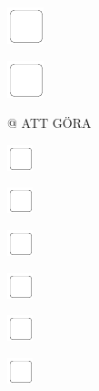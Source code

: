 \documentclass[11pt,titlepage]{article}
\begin{document}
\noindent
\includegraphics[]{checkbox-6mm.pdf}

\vspace{12mm}

\noindent
\includegraphics[]{checkbox-6mm.pdf}

\pagebreak

\small %

\noindent \hspace{-4mm} @ \hfill ATT GÖRA

\vspace{6mm}

\noindent
\includegraphics[]{checkbox-4mm.pdf}

\vspace{10mm}

\noindent
\includegraphics[]{checkbox-4mm.pdf}

\vspace{10mm}

\noindent
\includegraphics[]{checkbox-4mm.pdf}

\vspace{10mm}

\noindent
\includegraphics[]{checkbox-4mm.pdf}

\vspace{10mm}

\noindent
\includegraphics[]{checkbox-4mm.pdf}

\vspace{10mm}

\noindent
\includegraphics[]{checkbox-4mm.pdf}
\end{document}
